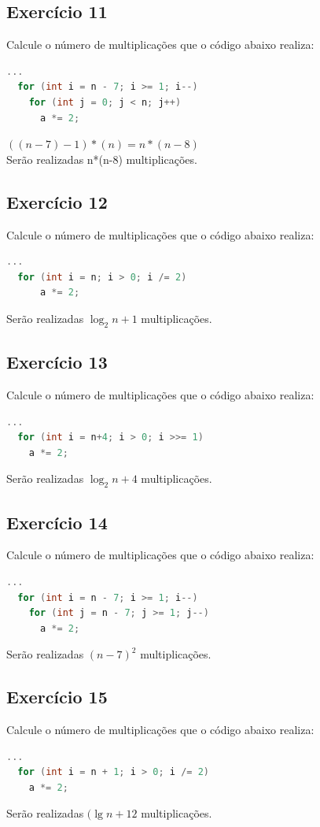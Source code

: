 \documentclass[12pt]{article}
\begin{document}
\subsection{Exercício 11}
Calcule o número de multiplicações que o código abaixo realiza:
\begin{lstlisting}[language=C]
  ...
  for (int i = n - 7; i >= 1; i--)
    for (int j = 0; j < n; j++)
      a *= 2;

\end{lstlisting}
$((n - 7) - 1) * (n) = n * (n - 8)$\\
Serão realizadas n*(n-8) multiplicações.

\subsection{Exercício 12}
Calcule o número de multiplicações que o código abaixo realiza:
\begin{lstlisting}[language=C]
  ...
  for (int i = n; i > 0; i /= 2)
      a *= 2;

\end{lstlisting}
Serão realizadas $\log_{2}{n} + 1$ multiplicações.

\subsection{Exercício 13}
Calcule o número de multiplicações que o código abaixo realiza:
\begin{lstlisting}[language=C]
  ...
  for (int i = n+4; i > 0; i >>= 1)
    a *= 2;
\end{lstlisting}
Serão realizadas $\log_{2}{n+4}$ multiplicações.

\subsection{Exercício 14}
Calcule o número de multiplicações que o código abaixo realiza:
\begin{lstlisting}[language=C]
  ...
  for (int i = n - 7; i >= 1; i--)
    for (int j = n - 7; j >= 1; j--)
      a *= 2;

\end{lstlisting}
Serão realizadas $(n - 7)^2$ multiplicações.




\subsection{Exercício 15}
Calcule o número de multiplicações que o código abaixo realiza:
\begin{lstlisting}[language=C]
  ...
  for (int i = n + 1; i > 0; i /= 2)
    a *= 2;
\end{lstlisting}
Serão realizadas $(\lg{n+1}2$ multiplicações.
\end{document}
